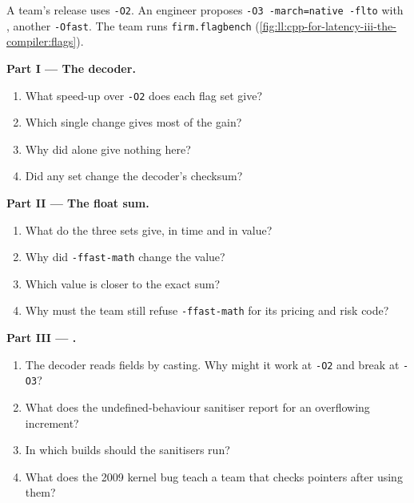 \begin{problem}\label{pb:ll:cpp-for-latency-iii-the-compiler:1}
A team's release uses \texttt{-O2}. An engineer proposes \texttt{-O3 -march=native -flto} with , another \texttt{-Ofast}. The team runs \texttt{firm.flagbench}
(\cref{fig:ll:cpp-for-latency-iii-the-compiler:flags}).

\medskip\noindent\textbf{Part I --- The decoder.}
\begin{enumerate}
\item What speed-up over \texttt{-O2} does each flag set give?
\item Which single change gives most of the gain?
\item Why did  alone give nothing here?
\item Did any set change the decoder's checksum?
\end{enumerate}

\medskip\noindent\textbf{Part II --- The float sum.}
\begin{enumerate}[resume]
\item What do the three sets give, in time and in value?
\item Why did \texttt{-ffast-math} change the value?
\item Which value is closer to the exact sum?
\item Why must the team still refuse \texttt{-ffast-math} for its pricing and risk code?
\end{enumerate}

\medskip\noindent\textbf{Part III --- .}
\begin{enumerate}[resume]
\item The decoder reads fields by casting. Why might it work at \texttt{-O2} and break at \texttt{-O3}?
\item What does the undefined-behaviour sanitiser report for an overflowing increment?
\item In which builds should the sanitisers run?
\item What does the 2009 kernel bug teach a team that checks pointers after using them?
\end{enumerate}


\end{problem}
